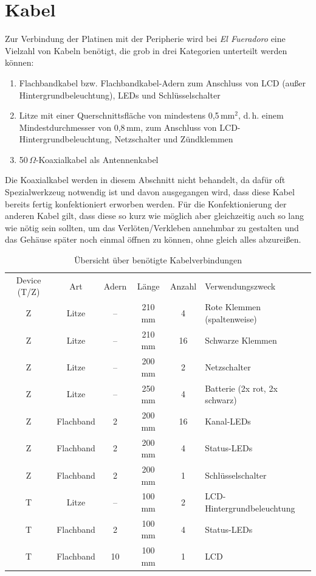 \documentclass[pdftex, parskip, numbers=noenddot, toc=listof]{scrbook}
\newcommand{\anlage}{\emph{El Fueradoro}}
\begin{document}
	\section{Kabel}

	Zur Verbindung der Platinen mit der Peripherie wird bei {\anlage} eine Vielzahl von Kabeln benötigt, die grob in drei Kategorien unterteilt werden können:
	\begin{enumerate}
		\item  Flachbandkabel bzw. Flachbandkabel-Adern zum Anschluss von LCD (außer Hintergrundbeleuchtung), LEDs und Schlüsselschalter
		\item Litze mit einer Querschnittsfläche von mindestens 0,5\,mm$^2$, d.\,h. einem Mindestdurchmesser von 0,8\,mm, zum Anschluss von LCD-Hintergrundbeleuchtung, Netzschalter und
		      Zündklemmen
		\item 50\,$\Omega$-Koaxialkabel als Antennenkabel
	\end{enumerate}

	Die Koaxialkabel werden in diesem Abschnitt nicht behandelt, da dafür oft Spezialwerkzeug notwendig ist und davon ausgegangen wird, dass diese Kabel bereits fertig konfektioniert erworben werden. Für die Konfektionierung der anderen Kabel gilt, dass diese so kurz wie möglich aber gleichzeitig auch so lang wie nötig sein sollten, um das Verlöten/Verkleben annehmbar zu gestalten und das Gehäuse später noch einmal öffnen zu können, ohne gleich alles abzureißen.

	\begin{table}
		\begin{tabularx}{\textwidth}{cccccX}
			\hline
			Device (T/Z) & Art       & Adern & Länge & Anzahl & Verwendungszweck              \\
			Z            & Litze     & --    & 210 mm & 4      & Rote Klemmen (spaltenweise)   \\
			Z            & Litze     & --    & 210 mm & 16     & Schwarze Klemmen              \\
			Z            & Litze     & --    & 200 mm & 2      & Netzschalter                  \\
			Z            & Litze     & --    & 250 mm & 4      & Batterie (2x rot, 2x schwarz) \\
			Z            & Flachband & 2     & 200 mm & 16     & Kanal-LEDs                    \\
			Z            & Flachband & 2     & 200 mm & 4      & Status-LEDs                   \\
			Z            & Flachband & 2     & 200 mm & 1      & Schlüsselschalter            \\ \hline
			T            & Litze     & --    & 100 mm & 2      & LCD-Hintergrundbeleuchtung    \\
			T            & Flachband & 2     & 100 mm & 4      & Status-LEDs                   \\
			T            & Flachband & 10    & 100 mm & 1      & LCD                           \\ \hline
		\end{tabularx}
		\caption{Übersicht über benötigte Kabelverbindungen}
		\label{tab:kabel}
	\end{table}
\end{document}
